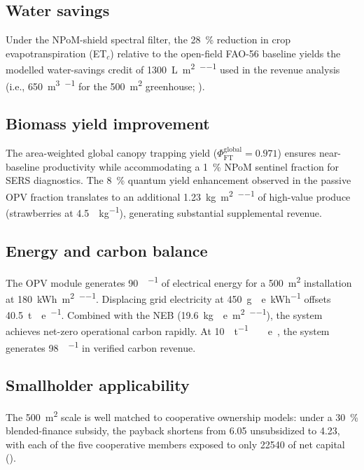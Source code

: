 \documentclass[11pt,a4paper]{article}
\begin{document}
\subsection{Water savings}

Under the NPoM-shield spectral filter, the \qty{28}{\percent} reduction in crop evapotranspiration (ET$_c$) relative to the open-field FAO-56 baseline yields the modelled water-savings credit of \qty{1300}{\L\per\m\squared\per\yr} used in the revenue analysis (i.e., \qty{650}{\m\cubed\per\yr} for the \qty{500}{\m\squared} greenhouse; ).

\subsection{Biomass yield improvement}

The area-weighted global canopy trapping yield ($\Phi_{\mathrm{FT}}^{\mathrm{global}} = 0.971$) ensures near-baseline productivity while accommodating a \qty{1}{\percent} NPoM sentinel fraction for SERS diagnostics. The \qty{8}{\percent} quantum yield enhancement observed in the passive OPV fraction translates to an additional \qty{1.23}{\kg\per\m\squared\per\yr} of high-value produce (strawberries at \qty{4.5}{\USD\per\kg}), generating substantial supplemental revenue.

\subsection{Energy and carbon balance}

The OPV module generates \qty{90}{\MWh\per\yr} of electrical energy for a \qty{500}{\m\squared} installation at \qty{180}{\kWh\per\m\squared\per\yr}. Displacing grid electricity at \qty{450}{\g{}e\per\kWh} offsets \qty{40.5}{\tonne{}e\per\yr}. Combined with the NEB (\qty{19.6}{\kg{}e\per\m\squared\per\yr}), the system achieves net-zero operational carbon rapidly. At \qty{10}{\USD\per\tonne\ e}~\cite{ICVCM2024}, the system generates \qty{98}{\USD\per\yr} in verified carbon revenue.

\subsection{Smallholder applicability}

The \qty{500}{\m\squared} scale is well matched to cooperative ownership models: under a \qty{30}{\percent} blended-finance subsidy, the payback shortens from \qty{6.05}{\yr} unsubsidized to \qty{4.23}{\yr}, with each of the five cooperative members exposed to only \qty{22540}{\USD} of net capital ().
\end{document}
